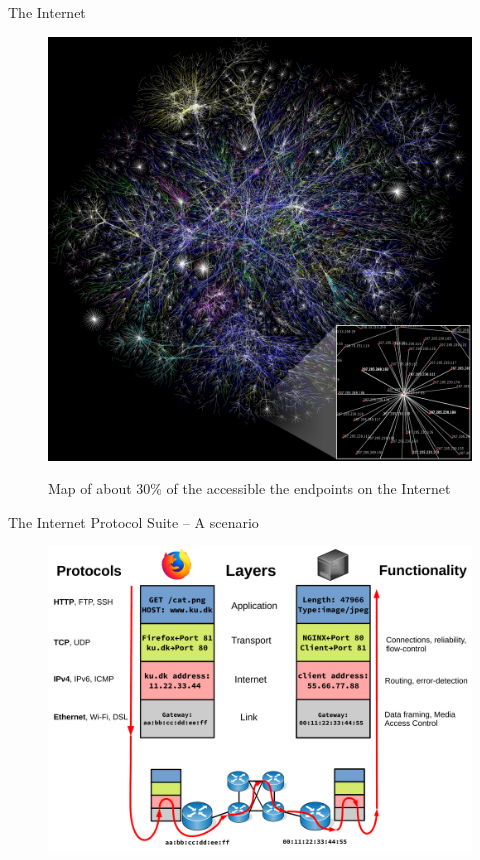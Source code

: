 \begin{frame}
The Internet

\begin{figure}
	\centering
\includegraphics[scale=0.15]{./background/internet_map.jpg}
\label{fig: Internet map}
\caption{Map of about 30\% of the accessible the endpoints on the Internet}
\end{figure}

\end{frame}


\begin{frame}
The Internet Protocol Suite -- A scenario
\begin{figure}
	\centering
\includegraphics[scale=0.28]{./background/internet_scenario.pdf}
\end{figure}



\end{frame}


